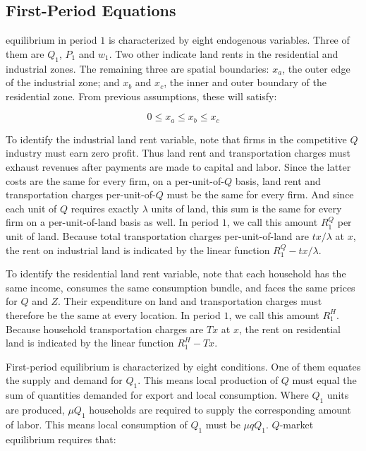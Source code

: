 \subsection{First-Period Equations}

equilibrium in period $1$ is characterized by eight endogenous variables. Three of them are $Q_1$, $P_1$ and $w_1$. Two other indicate land rents in the residential and industrial zones. The remaining three are spatial boundaries: $x_a$, the outer edge of the industrial zone; and $x_b$ and $x_c$, the inner and outer boundary of the residential zone. From previous assumptions, these will satisfy:

\begin{equation*}
    0 \leq x_a \leq x_b \leq x_c
\end{equation*}

To identify the industrial land rent variable, note that firms in the competitive $Q$ industry must earn zero profit. Thus land rent and transportation charges must exhaust revenues after payments are made to capital and labor. Since the latter costs are the same for every firm, on a per-unit-of-$Q$ basis, land rent and transportation charges per-unit-of-$Q$ must be the same for every firm. And since each unit of $Q$ requires exactly $\lambda$ units of land, this sum is the same for every firm on a per-unit-of-land basis as well. In period $1$, we call this amount $R_1^Q$ per unit of land. Because total transportation charges per-unit-of-land are $tx / \lambda$ at $x$, the rent on industrial land is indicated by the linear function $R_1^Q - tx / \lambda$.

To  identify the residential land rent variable, note that each household has the same income, consumes the same consumption bundle, and faces the same prices for $Q$ and $Z$. Their expenditure on land and transportation charges must therefore be the same at every location. In period $1$, we call this amount $R_1^H$. Because household transportation charges are $Tx$ at $x$, the rent on residential land is indicated by the linear function $R_1^H - Tx$.

First-period equilibrium is characterized by eight conditions. One of them equates the supply and demand for $Q_1$. This means local production of $Q$ must equal the sum of quantities demanded for export and local consumption. Where $Q_1$ units are produced, $\mu Q_1$ households are required to supply the corresponding amount of labor. This means local consumption of $Q_1$ must be $\mu qQ_1$. $Q$-market equilibrium requires that:


